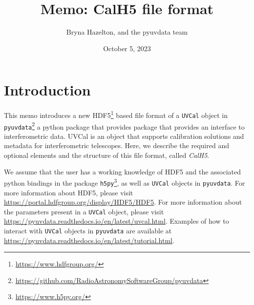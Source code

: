 \documentclass[11pt, oneside]{article}
\title{Memo: CalH5 file format}
\author{Bryna Hazelton, and the pyuvdata team}
\date{October 5, 2023}
\begin{document}
\maketitle
\section{Introduction}
\label{sec:intro}

This memo introduces a new HDF5\footnote{\url{https://www.hdfgroup.org/}} based
file format of a \texttt{UVCal} object in
\texttt{pyuvdata}\footnote{\url{https://github.com/RadioAstronomySoftwareGroup/pyuvdata}}
a python package that provides package that provides an interface to interferometric data.
UVCal is an object that supports calibration solutions and metadata for interferometric telescopes.
Here, we describe the required and optional elements and the structure of this file format, called
\textit{CalH5}.

We assume that the user has a working knowledge of HDF5 and the associated
python bindings in the package \texttt{h5py}\footnote{\url{https://www.h5py.org/}}, as
well as \texttt{UVCal} objects in \texttt{pyuvdata}. For more information about
HDF5, please visit \url{https://portal.hdfgroup.org/display/HDF5/HDF5}. For more
information about the parameters present in a \texttt{UVCal} object, please visit
\url{https://pyuvdata.readthedocs.io/en/latest/uvcal.html}.
Examples of how to interact with \texttt{UVCal} objects in \texttt{pyuvdata} are
available at \url{https://pyuvdata.readthedocs.io/en/latest/tutorial.html}.
\end{document}
